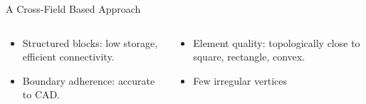 \documentclass[compress,10pt,aspectratio=169]{beamer}
\begin{document}
\begin{frame}{A Cross-Field Based Approach}
{\begin{columns}
\begin{column}{0.5\textwidth}
\begin{itemize}
\item Structured blocks: {\color{onera_gray} low storage, efficient connectivity.}\\\vspace{0.3cm}
\item Boundary adherence: {\color{onera_gray} accurate to CAD.}
\end{itemize}
\end{column}




\begin{column}{0.5\textwidth}
\begin{itemize}
\item Element quality: {\color{onera_gray} topologically close to square, rectangle, convex.}\\\vspace{0.3cm}
\item Few irregular vertices
\end{itemize}
\end{column}
\end{columns}
\vspace{0.35cm}
}

\end{frame}
\end{document}

